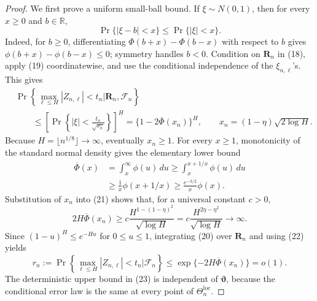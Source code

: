 \documentclass{article}
\begin{document}
\begin{proof}
We first prove a uniform small-ball bound.  If \(\xi\sim N(0,1)\), then for
every \(x\geq0\) and \(b\in\mathbb R\),
\[
 \Pr\{|\xi-b|<x\}\leq\Pr\{|\xi|<x\}.                       \tag{19}
\]
Indeed, for \(b\geq0\), differentiating
\(\Phi(b+x)-\Phi(b-x)\) with respect to \(b\) gives
\(\phi(b+x)-\phi(b-x)\leq0\); symmetry handles \(b<0\).
Condition on \(\boldsymbol R_n\) in (18), apply (19) coordinatewise, and use
the conditional independence of the \(\xi_{n,\ell}\)'s.  This gives
\[
\begin{aligned}
 &\Pr\left\{\max_{\ell\leq H}|Z_{n,\ell}|<t_n
       \mathrel{\big|}\boldsymbol R_n,\mathcal F_n\right\}\\
 &\qquad\leq
 \left[\Pr\left\{|\xi|<\frac{t_n}{\sqrt{\nu_n}}\right\}\right]^H
 =\{1-2\overline\Phi(x_n)\}^{H},
 \qquad x_n=(1-\eta)\sqrt{2\log H}.                         \tag{20}
\end{aligned}
\]
Because \(H=\lfloor n^{1/8}\rfloor\to\infty\), eventually \(x_n\geq1\).
For every \(x\geq1\), monotonicity of the standard normal density gives the
elementary lower bound
\[
\begin{aligned}
 \overline\Phi(x)
 &=\int_x^\infty\phi(u)\,du
 \geq\int_x^{x+1/x}\phi(u)\,du\\
 &\geq\frac1x\phi(x+1/x)
 \geq\frac{e^{-3/2}}{x}\phi(x).                             \tag{21}
\end{aligned}
\]
Substitution of \(x_n\) into (21) shows that, for a universal constant
\(c>0\),
\[
 2H\overline\Phi(x_n)
 \geq c\frac{H^{1-(1-\eta)^2}}{\sqrt{\log H}}
 =c\frac{H^{2\eta-\eta^2}}{\sqrt{\log H}}
 \longrightarrow\infty.                                    \tag{22}
\]
Since \((1-u)^H\leq e^{-Hu}\) for \(0\leq u\leq1\), integrating (20) over
\(\boldsymbol R_n\) and using (22) yields
\[
 r_n:=\Pr\left\{\max_{\ell\leq H}|Z_{n,\ell}|<t_n
                 \mathrel{\big|}\mathcal F_n\right\}
 \leq\exp\{-2H\overline\Phi(x_n)\}=o(1).                  \tag{23}
\]
The deterministic upper bound in (23) is independent of
\(\boldsymbol\vartheta\), because the conditional error law is the same at
every point of \(\Theta_n^{\mathrm{loc}}\).


\end{proof}
\end{document}

